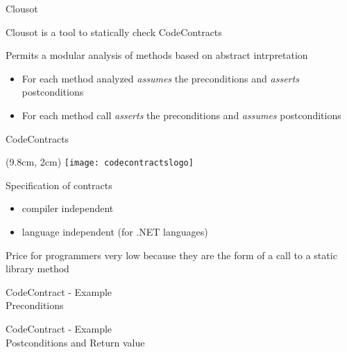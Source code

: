 \begin{frame}{Clousot}

Clousot is a tool to statically check CodeContracts

\vspace*{1cm}

Permits a modular analysis of methods based on abstract intrpretation
\begin{itemize}
  \item For each method analyzed \emph{assumes} the preconditions and
  \emph{asserts} postconditions

  \item For each method call \emph{asserts} the preconditions and
  \emph{assumes} postconditions
\end{itemize}

\end{frame}



\begin{frame}{CodeContracts}

\begin{textblock*}{1cm}(9.8cm, 2cm)
    \texttt{[image: codecontractslogo]}
\end{textblock*}

Specification of contracts
\begin{itemize}
  \item compiler independent
  \item language independent (for .NET languages)
\end{itemize}

\vspace*{1cm}

Price for programmers very low because they are the form of a call to a static
library method

\end{frame}


\begin{frame}[fragile]{CodeContract - Example\\Preconditions}
\vspace*{-0.4cm}

\end{frame}



\begin{frame}[fragile]{CodeContract - Example\\Postconditions and Return value}
\vspace*{-0.3cm}

\end{frame}



